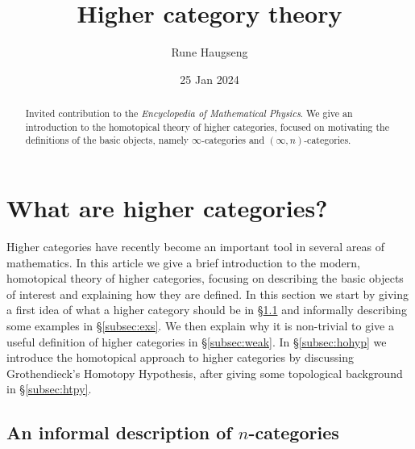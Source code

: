 \documentclass[a4paper,12pt]{article}
\title{Higher category theory}
\author{Rune Haugseng}
\date{25 Jan 2024}
\begin{document}
\maketitle
\begin{abstract}
  Invited contribution to the \emph{Encyclopedia of Mathematical
    Physics}. We give an introduction to the homotopical theory of
  higher categories, focused on motivating the definitions of the
  basic objects, namely $\infty$-categories and
  $(\infty,n)$-categories.
\end{abstract}

\newpage
\tableofcontents
\newpage

\section{What are higher categories?}
Higher categories have recently become an important tool in several
areas of mathematics. In this article we give a brief
introduction to the modern, homotopical theory of higher categories,
focusing on describing the basic objects of interest and explaining
how they are defined. In this section we start by giving a first idea
of what a higher category should be in \S\ref{subsec:ncats} and
informally describing some examples in \S\ref{subsec:exs}. We then
explain why it is non-trivial to give a useful definition of higher
categories in \S\ref{subsec:weak}.  In \S\ref{subsec:hohyp} we
introduce the homotopical approach to higher categories by discussing
Grothendieck's Homotopy Hypothesis, after giving some topological
background in \S\ref{subsec:htpy}.


\subsection{An informal description of $n$-categories}\label{subsec:ncats}
\end{document}
